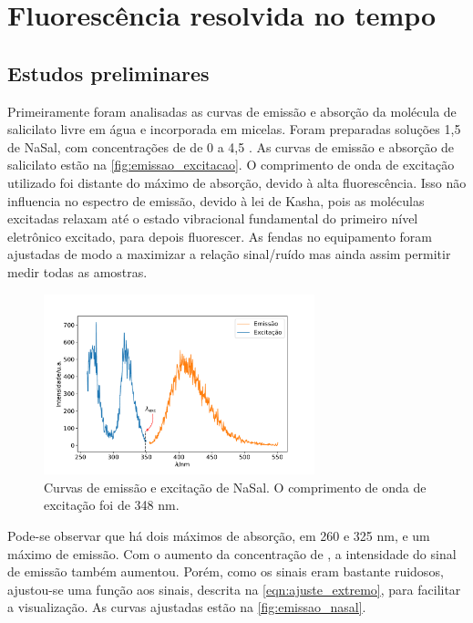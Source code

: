 	\chapter{Fluorescência resolvida no tempo}
	
	\section{Estudos preliminares}  
	
	Primeiramente foram analisadas as curvas de emissão e absorção da molécula de salicilato livre em água e incorporada em micelas. Foram preparadas soluções 1,5 \mM{} de NaSal, com concentrações de \TTAB{} de 0 a 4,5 \mM. As curvas de emissão e absorção de salicilato estão na \autoref{fig:emissao_excitacao}. O comprimento de onda de excitação utilizado foi distante do máximo de absorção, devido à alta fluorescência. Isso não influencia no espectro de emissão, devido à lei de Kasha, pois as moléculas excitadas relaxam até o estado vibracional fundamental do primeiro nível eletrônico excitado, para depois fluorescer. As fendas no equipamento foram ajustadas de modo a maximizar a relação sinal/ruído mas ainda assim permitir medir todas as amostras.
	
	\begin{figure}[h]
		\centering
		\includegraphics[width=0.7\textwidth]{imagens/fluor/emissao_excitacao}
		\caption{Curvas de emissão e excitação de NaSal. O comprimento de onda de excitação foi de 348 nm.}
		\label{fig:emissao_excitacao}
	\end{figure}

	Pode-se observar que há dois máximos de absorção, em 260 e 325 nm, e um máximo de emissão. Com o aumento da concentração de \TTAB{}, a intensidade do sinal de emissão também aumentou. Porém, como os sinais eram bastante ruidosos, ajustou-se uma função aos sinais, descrita na \autoref{eqn:ajuste_extremo}, para facilitar a visualização. As curvas ajustadas estão na \autoref{fig:emissao_nasal}.

